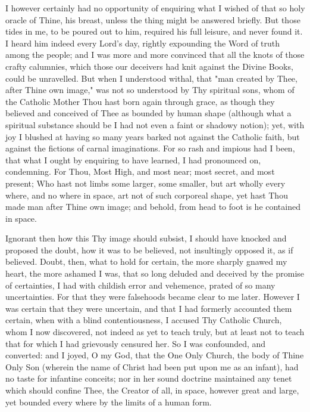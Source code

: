 \documentclass[b5paper,openright,12pt,twoside]{book}
\begin{document}
I however certainly had no opportunity of enquiring what I wished of
that so holy oracle of Thine, his breast, unless the thing might be
answered briefly. But those tides in me, to be poured out to him,
required his full leisure, and never found it. I heard him indeed every
Lord's day, rightly expounding the Word of truth among the people; and
I was more and more convinced that all the knots of those crafty
calumnies, which those our deceivers had knit against the Divine Books,
could be unravelled. But when I understood withal, that "man created
by Thee, after Thine own image," was not so understood by Thy spiritual
sons, whom of the Catholic Mother Thou hast born again through grace,
as though they believed and conceived of Thee as bounded by human shape
(although what a spiritual substance should be I had not even a faint or
shadowy notion); yet, with joy I blushed at having so many years barked
not against the Catholic faith, but against the fictions of carnal
imaginations. For so rash and impious had I been, that what I ought by
enquiring to have learned, I had pronounced on, condemning. For Thou,
Most High, and most near; most secret, and most present; Who hast not
limbs some larger, some smaller, but art wholly every where, and no
where in space, art not of such corporeal shape, yet hast Thou made man
after Thine own image; and behold, from head to foot is he contained in
space.

Ignorant then how this Thy image should subsist, I should have knocked
and proposed the doubt, how it was to be believed, not insultingly
opposed it, as if believed. Doubt, then, what to hold for certain,
the more sharply gnawed my heart, the more ashamed I was, that so long
deluded and deceived by the promise of certainties, I had with childish
error and vehemence, prated of so many uncertainties. For that they were
falsehoods became clear to me later. However I was certain that they
were uncertain, and that I had formerly accounted them certain, when
with a blind contentiousness, I accused Thy Catholic Church, whom I now
discovered, not indeed as yet to teach truly, but at least not to teach
that for which I had grievously censured her. So I was confounded, and
converted: and I joyed, O my God, that the One Only Church, the body of
Thine Only Son (wherein the name of Christ had been put upon me as an
infant), had no taste for infantine conceits; nor in her sound doctrine
maintained any tenet which should confine Thee, the Creator of all, in
space, however great and large, yet bounded every where by the limits of
a human form.
\end{document}
